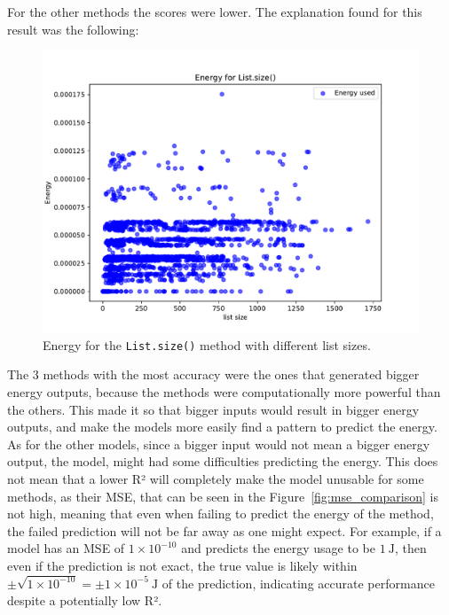 For the other methods the scores were lower. The explanation found for this result was the following:


\begin{figure}[htbp]
  \centering
  \includegraphics[width = .8 \textwidth]{figures/size_energy.pdf}
  \caption{Energy for the \texttt{List.size()} method with different list sizes.}
  \label{fig:size_energy}
\end{figure}

The 3 methods with the most accuracy were the ones that generated bigger energy outputs, because the methods were computationally more powerful than the others. This made it so that bigger inputs would result in bigger energy outputs, and make the models more easily find a pattern to predict the energy. As for the other models, since a bigger input would not mean a bigger energy output, the model, might had some difficulties predicting the energy. This does not mean that a lower R² will completely make the model unusable for some methods, as their MSE, that can be seen in the Figure~\ref{fig:mse_comparison} is not high, meaning that even when failing to predict the energy of the method, the failed prediction will not be far away as one might expect. For example, if a model has an MSE of $1 \times 10^{-10}$ and predicts the energy usage to be $1~\mathrm{J}$, then even if the prediction is not exact, the true value is likely within $\pm \sqrt{1 \times 10^{-10}} = \pm 1 \times 10^{-5}~\mathrm{J}$ of the prediction, indicating accurate performance despite a potentially low R². 

